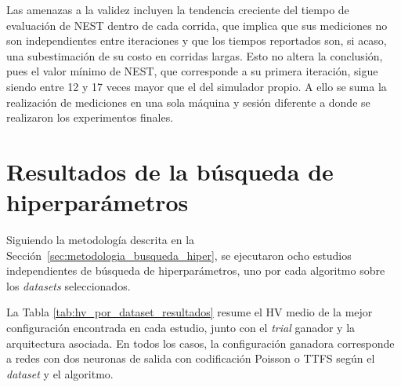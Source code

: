 Las amenazas a la validez incluyen la tendencia creciente del tiempo de evaluación de NEST dentro de cada corrida, que implica que sus mediciones no son independientes entre iteraciones y que los tiempos reportados son, si acaso, una subestimación de su costo en corridas largas. Esto no altera la conclusión, pues el valor mínimo de NEST, que corresponde a su primera iteración, sigue siendo entre 12 y 17 veces mayor que el del simulador propio. A ello se suma la realización de mediciones en una sola máquina y sesión diferente a donde se realizaron los experimentos finales.



\section{Resultados de la búsqueda de hiperparámetros}

Siguiendo la metodología descrita en la Sección~\ref{sec:metodologia_busqueda_hiper}, se ejecutaron ocho estudios independientes de búsqueda de hiperparámetros, uno por cada algoritmo sobre los \textit{datasets} seleccionados.

La Tabla \ref{tab:hv_por_dataset_resultados} resume el HV medio de la mejor configuración encontrada en cada estudio, junto con el \emph{trial} ganador y la arquitectura asociada. En todos los casos, la configuración ganadora corresponde a redes con dos neuronas de salida con codificación Poisson o TTFS según el \textit{dataset} y el algoritmo.

